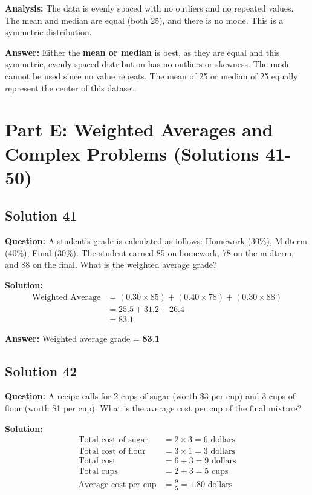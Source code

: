 \documentclass[12pt,a4paper]{article}
\begin{document}
\textbf{Analysis:} The data is evenly spaced with no outliers and no repeated values. The mean and median are equal (both 25), and there is no mode. This is a symmetric distribution.

\textbf{Answer:} Either the \textbf{mean or median} is best, as they are equal and this symmetric, evenly-spaced distribution has no outliers or skewness. The mode cannot be used since no value repeats. The mean of 25 or median of 25 equally represent the center of this dataset.

\newpage

\section{Part E: Weighted Averages and Complex Problems (Solutions 41-50)}

\subsection*{Solution 41}
\textbf{Question:} A student's grade is calculated as follows: Homework (30\%), Midterm (40\%), Final (30\%). The student earned 85 on homework, 78 on the midterm, and 88 on the final. What is the weighted average grade?

\textbf{Solution:}
\begin{align*}
\text{Weighted Average} &= (0.30 \times 85) + (0.40 \times 78) + (0.30 \times 88) \\
&= 25.5 + 31.2 + 26.4 \\
&= 83.1
\end{align*}

\textbf{Answer:} Weighted average grade = \textbf{83.1}

\subsection*{Solution 42}
\textbf{Question:} A recipe calls for 2 cups of sugar (worth \$3 per cup) and 3 cups of flour (worth \$1 per cup). What is the average cost per cup of the final mixture?

\textbf{Solution:}
\begin{align*}
\text{Total cost of sugar} &= 2 \times 3 = 6 \text{ dollars} \\
\text{Total cost of flour} &= 3 \times 1 = 3 \text{ dollars} \\
\text{Total cost} &= 6 + 3 = 9 \text{ dollars} \\
\text{Total cups} &= 2 + 3 = 5 \text{ cups} \\
\text{Average cost per cup} &= \frac{9}{5} = 1.80 \text{ dollars}
\end{align*}
\end{document}
